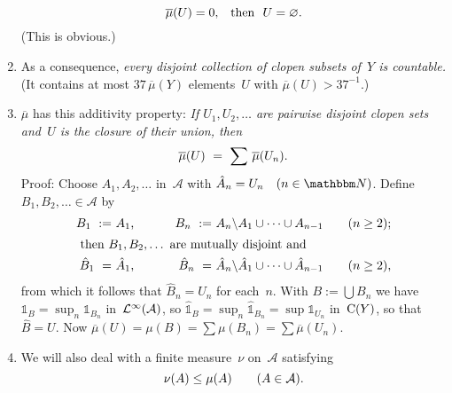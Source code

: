 \documentclass[main.tex]{subfiles}
\begin{document}
\begin{psec}{6.20}
\begin{enumerate}
{\begin{equation*}
\overline\mu(U)=0\htam{,\quad then }\ U=\varnothing\htam{.}
\end{equation*}}%
(This is obvious.)
%
\item\label{6.20-6}
As a consequence,
\emph{every disjoint collection of clopen subsets of~$Y$
is countable.}
(It contains at most $37\,\overline{\mu}(Y)$ elements~$U$
with $\overline \mu(U)>37^{-1}$.)
%
\item\label{6.20-7}
$\overline\mu$ has this additivity property:
\emph{If $U_1,U_2,\dotsc$ are pairwise disjoint
clopen sets and~$U$ is the closure of their union,
then
\begin{equation*}
\overline\mu(U)\ =\ \sum\,\overline\mu(U_n)\htam{.}
\end{equation*}}
Proof:
Choose $A_1,A_2,\dotsc$ in~$\mathcal A$
with $\hat{A}_n=U_n\quad(n\in\N)$.
Define $B_1,B_2,\dotsc\in\mathcal A$ by
\begin{alignat*}{4}
B_1\ :=&\ A_1\htam{, }&\qquad
B_n\ :=&\ A_n\backslash A_1\cup\dotsb\cup A_{n-1}& \quad &(n\geq 2)\htam{;} \\
\shortintertext{
then $B_1,B_2,\dotsc$ are mutually disjoint and}
\hat{B}_1\ =&\ \hat{A}_1\htam{, }&\qquad
\hat{B}_n\ =&\ \hat{A}_n\backslash \hat{A}_1 \cup\dotsb\cup\hat{A}_{n-1}&
  \quad&(n\geq 2)\htam{,}
\end{alignat*}
from which it follows that $\hat{B}_n=U_n$
for each~$n$.
With $B:=\bigcup B_n$
we have $\mathbb{1}_B=\sup_n \mathbb{1}_{B_n}$
in~$\mathcal{L}^\infty(\mathcal A)$,
so $\hat{\mathbb{1}}_B=\sup_n \hat{\mathbb{1}}_{B_n}=\sup \mathbb{1}_{U_n}$
in~$\mathrm{C}(Y)$,
so that $\hat{B}=U$.
Now $\overline\mu(U)=\mu(B)
=\sum\mu(B_n)=\sum\overline\mu(U_n)$.
%
\item\label{6.20-8}
We will also deal with a finite measure~$\nu$ on~$\mathcal A$ satisfying
\begin{equation*}
\nu(A)\leq\mu(A)\qquad(A\in\mathcal A)\text{.}
\end{equation*}


\end{enumerate}
\end{psec}
\end{document}
